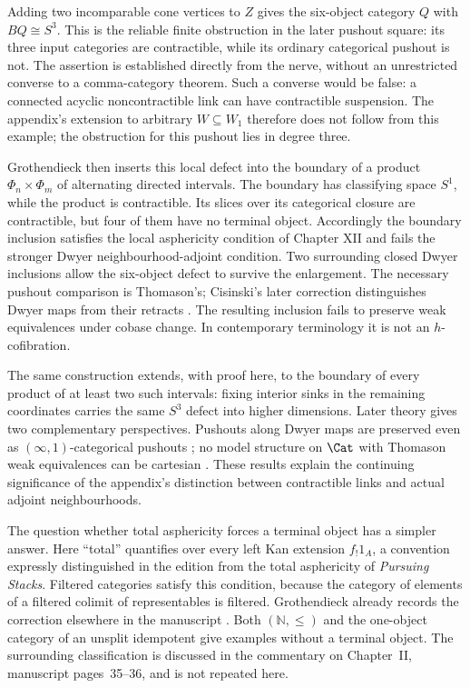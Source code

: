 Adding two incomparable cone vertices to \(Z\) gives the six-object category \(Q\) with \(BQ\cong S^3\). This is the reliable finite obstruction in the later pushout square: its three input categories are contractible, while its ordinary categorical pushout is not. The assertion is established directly from the nerve, without an unrestricted converse to a comma-category theorem. Such a converse would be false: a connected acyclic noncontractible link can have contractible suspension. The appendix's extension to arbitrary \(W\subseteq W_1\) therefore does not follow from this example; the obstruction for this pushout lies in degree three.

Grothendieck then inserts this local defect into the boundary of a product \(\Phi_n\times\Phi_m\) of alternating directed intervals. The boundary has classifying space \(S^1\), while the product is contractible. Its slices over its categorical closure are contractible, but four of them have no terminal object. Accordingly the boundary inclusion satisfies the local asphericity condition of Chapter XII and fails the stronger Dwyer neighbourhood-adjoint condition. Two surrounding closed Dwyer inclusions allow the six-object defect to survive the enlargement. The necessary pushout comparison is Thomason's; Cisinski's later correction distinguishes Dwyer maps from their retracts \citep{Thomason1980,Cisinski1999Dwyer}. The resulting inclusion fails to preserve weak equivalences under cobase change. In contemporary terminology it is not an \(h\)-cofibration.

The same construction extends, with proof here, to the boundary of every product of at least two such intervals: fixing interior sinks in the remaining coordinates carries the same \(S^3\) defect into higher dimensions. Later theory gives two complementary perspectives. Pushouts along Dwyer maps are preserved even as \((\infty,1)\)-categorical pushouts \citep{HackneyOzornovaRiehlRovelli2024}; no model structure on \(\Cat\) with Thomason weak equivalences can be cartesian \citep[Proposition~4.3]{Pavlov2024Thomason}. These results explain the continuing significance of the appendix's distinction between contractible links and actual adjoint neighbourhoods.

The question whether total asphericity forces a terminal object has a simpler answer. Here ``total'' quantifies over every left Kan extension \(f_!1_A\), a convention expressly distinguished in the edition from the total asphericity of \emph{Pursuing Stacks}. Filtered categories satisfy this condition, because the category of elements of a filtered colimit of representables is filtered. Grothendieck already records the correction elsewhere in the manuscript \citep[Chapter II, Corollaries~2.17--2.18]{Grothendieck1990II}. Both \((\mathbb N,\leq)\) and the one-object category of an unsplit idempotent give examples without a terminal object. The surrounding classification is discussed in the commentary on Chapter~II, manuscript pages~35--36, and is not repeated here.

